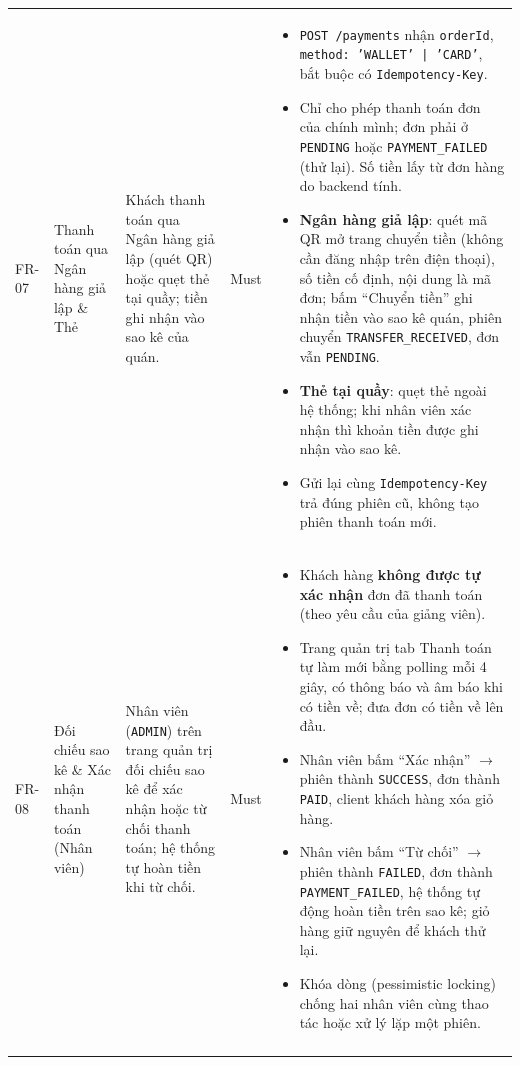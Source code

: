 \begin{longtable}{@{}p{1.2cm}p{2.6cm}p{4.2cm}p{1.4cm}p{6.6cm}@{}}
FR-07 & Thanh toán qua Ngân hàng giả lập \& Thẻ
  & Khách thanh toán qua Ngân hàng giả lập (quét QR) hoặc quẹt thẻ tại quầy; tiền ghi nhận vào sao kê của quán.
  & Must
  & \begin{itemize}[leftmargin=*]
      \item \texttt{POST /payments} nhận \texttt{orderId}, \texttt{method: 'WALLET' | 'CARD'}, bắt buộc có \texttt{Idempotency-Key}.
      \item Chỉ cho phép thanh toán đơn của chính mình; đơn phải ở \texttt{PENDING} hoặc \texttt{PAYMENT\_FAILED} (thử lại). Số tiền lấy từ đơn hàng do backend tính.
      \item \textbf{Ngân hàng giả lập}: quét mã QR mở trang chuyển tiền (không cần đăng nhập trên điện thoại), số tiền cố định, nội dung là mã đơn; bấm ``Chuyển tiền'' ghi nhận tiền vào sao kê quán, phiên chuyển \texttt{TRANSFER\_RECEIVED}, đơn vẫn \texttt{PENDING}.
      \item \textbf{Thẻ tại quầy}: quẹt thẻ ngoài hệ thống; khi nhân viên xác nhận thì khoản tiền được ghi nhận vào sao kê.
      \item Gửi lại cùng \texttt{Idempotency-Key} trả đúng phiên cũ, không tạo phiên thanh toán mới.
    \end{itemize} \\
\addlinespace

FR-08 & Đối chiếu sao kê \& Xác nhận thanh toán (Nhân viên)
  & Nhân viên (\texttt{ADMIN}) trên trang quản trị đối chiếu sao kê để xác nhận hoặc từ chối thanh toán; hệ thống tự hoàn tiền khi từ chối.
  & Must
  & \begin{itemize}[leftmargin=*]
      \item Khách hàng \textbf{không được tự xác nhận} đơn đã thanh toán (theo yêu cầu của giảng viên).
      \item Trang quản trị tab Thanh toán tự làm mới bằng polling mỗi 4 giây, có thông báo và âm báo khi có tiền về; đưa đơn có tiền về lên đầu.
      \item Nhân viên bấm ``Xác nhận'' $\rightarrow$ phiên thành \texttt{SUCCESS}, đơn thành \texttt{PAID}, client khách hàng xóa giỏ hàng.
      \item Nhân viên bấm ``Từ chối'' $\rightarrow$ phiên thành \texttt{FAILED}, đơn thành \texttt{PAYMENT\_FAILED}, hệ thống tự động hoàn tiền trên sao kê; giỏ hàng giữ nguyên để khách thử lại.
      \item Khóa dòng (pessimistic locking) chống hai nhân viên cùng thao tác hoặc xử lý lặp một phiên.
    \end{itemize} \\
\addlinespace


\end{longtable}
